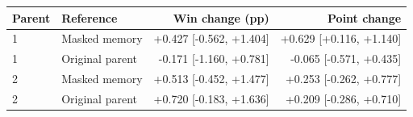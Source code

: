 \begin{tabular}{llrr}
\toprule
Parent & Reference & Win change (pp) & Point change \\
\midrule
1 & Masked memory & +0.427 [-0.562, +1.404] & +0.629 [+0.116, +1.140] \\
1 & Original parent & -0.171 [-1.160, +0.781] & -0.065 [-0.571, +0.435] \\
2 & Masked memory & +0.513 [-0.452, +1.477] & +0.253 [-0.262, +0.777] \\
2 & Original parent & +0.720 [-0.183, +1.636] & +0.209 [-0.286, +0.710] \\
\bottomrule
\end{tabular}
